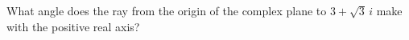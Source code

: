 What angle does the ray from the origin of the complex plane to $3+\sqrt3\,i$ make with the positive real axis?
